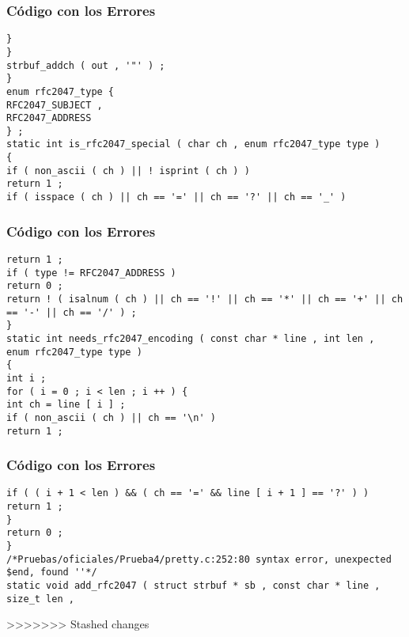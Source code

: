 \documentclass{beamer}
\begin{document}
\begin{frame}[fragile]
\frametitle{C\'odigo con los Errores}
\begin{verbatim}
} 
} 
strbuf_addch ( out , '"' ) ; 
} 
enum rfc2047_type { 
RFC2047_SUBJECT , 
RFC2047_ADDRESS 
} ; 
static int is_rfc2047_special ( char ch , enum rfc2047_type type ) 
{ 
if ( non_ascii ( ch ) || ! isprint ( ch ) ) 
return 1 ; 
if ( isspace ( ch ) || ch == '=' || ch == '?' || ch == '_' ) 
\end{verbatim}
\end{frame}
\begin{frame}[fragile]
\frametitle{C\'odigo con los Errores}
\begin{verbatim}
return 1 ; 
if ( type != RFC2047_ADDRESS ) 
return 0 ; 
return ! ( isalnum ( ch ) || ch == '!' || ch == '*' || ch == '+' || ch == '-' || ch == '/' ) ; 
} 
static int needs_rfc2047_encoding ( const char * line , int len , 
enum rfc2047_type type ) 
{ 
int i ; 
for ( i = 0 ; i < len ; i ++ ) { 
int ch = line [ i ] ; 
if ( non_ascii ( ch ) || ch == '\n' ) 
return 1 ; 
\end{verbatim}
\end{frame}
\begin{frame}[fragile]
\frametitle{C\'odigo con los Errores}
\begin{verbatim}
if ( ( i + 1 < len ) && ( ch == '=' && line [ i + 1 ] == '?' ) ) 
return 1 ; 
} 
return 0 ; 
} 
/*Pruebas/oficiales/Prueba4/pretty.c:252:80 syntax error, unexpected $end, found ''*/
static void add_rfc2047 ( struct strbuf * sb , const char * line , size_t len , \end{verbatim}
>>>>>>> Stashed changes
\end{frame}
\end{document}
